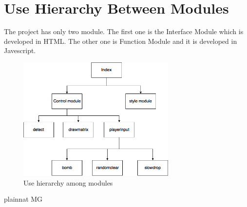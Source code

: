 \documentclass[12pt, titlepage]{article}
\begin{document}
\section{Use Hierarchy Between Modules} \label{SecUse}
The project has only two module. The first one is the Interface Module which is developed in HTML. The other one is Function Module and it is developed in Javescript.


\begin{figure}[H]
\centering
\includegraphics[width=0.7\textwidth]{UsesHierarchy.png}
\caption{Use hierarchy among modules}
\label{FigUH}
\end{figure}


 {plainnat}
 {MG}
\end{document}

